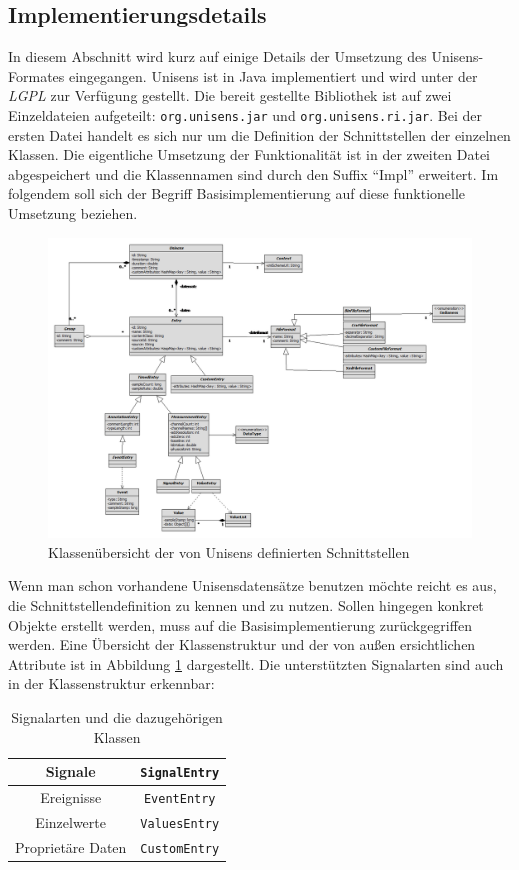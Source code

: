 \subsection{Implementierungsdetails}

In diesem Abschnitt wird kurz auf einige Details der Umsetzung des Unisens-Formates eingegangen.
Unisens ist in Java implementiert und wird unter der \emph{\ac{LGPL}} zur Verf\"ugung gestellt.
Die bereit gestellte Bibliothek ist auf zwei Einzeldateien aufgeteilt: \verb|org.unisens.jar| und \verb|org.unisens.ri.jar|.
Bei der ersten Datei handelt es sich nur um die Definition der Schnittstellen der einzelnen Klassen.
Die eigentliche Umsetzung der Funktionalit\"at ist in der zweiten Datei abgespeichert und die Klassennamen sind durch den Suffix "`Impl"' erweitert.
Im folgendem soll sich der Begriff Basisimplementierung auf diese funktionelle Umsetzung beziehen.
\begin{figure}
\includegraphics[width=\textwidth]{bilder/unisens_interface.png}
\caption{Klassen\"ubersicht der von Unisens definierten Schnittstellen}
\label{pic:unisens_interface}
\end{figure}
Wenn man schon vorhandene Unisensdatens\"atze benutzen m\"ochte reicht es aus, die Schnittstellendefinition zu kennen und zu nutzen.
Sollen hingegen konkret Objekte erstellt werden, muss auf die Basisimplementierung zur\"uckgegriffen werden.
Eine \"Ubersicht der Klassenstruktur und der von au\ss en ersichtlichen Attribute ist in Abbildung \ref{pic:unisens_interface} dargestellt.
Die unterst\"utzten Signalarten sind auch in der Klassenstruktur erkennbar:
\begin{table}[h]
\centering
\begin{tabular}{|c|c|}
	\hline Signale & \verb|SignalEntry| \\
	\hline Ereignisse & \verb|EventEntry| \\
	\hline Einzelwerte & \verb|ValuesEntry| \\
	\hline Propriet\"are Daten & \verb|CustomEntry| \\
	\hline
\end{tabular}
\caption{Signalarten und die dazugeh\"origen Klassen}
\label{tab:signal_klassen}
\end{table}


